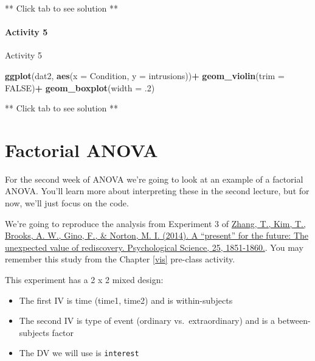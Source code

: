 \documentclass[]{book}
\newenvironment{Shaded}{\begin{snugshade}}{\end{snugshade}}
\newcommand{\DataTypeTok}[1]{\textcolor[rgb]{0.13,0.29,0.53}{#1}}
\newcommand{\FloatTok}[1]{\textcolor[rgb]{0.00,0.00,0.81}{#1}}
\newcommand{\KeywordTok}[1]{\textcolor[rgb]{0.13,0.29,0.53}{\textbf{#1}}}
\newcommand{\NormalTok}[1]{#1}
\newcommand{\OperatorTok}[1]{\textcolor[rgb]{0.81,0.36,0.00}{\textbf{#1}}}
\newcommand{\OtherTok}[1]{\textcolor[rgb]{0.56,0.35,0.01}{#1}}
\newcommand{\StringTok}[1]{\textcolor[rgb]{0.31,0.60,0.02}{#1}}
\providecommand{\tightlist}{%
  \setlength{\itemsep}{0pt}\setlength{\parskip}{0pt}}
\begin{document}
** Click tab to see solution **

\hypertarget{activity-5-4}{%
\subsubsection{Activity 5}\label{activity-5-4}}

Activity 5

\begin{Shaded}
\begin{Highlighting}[]
\KeywordTok{ggplot}\NormalTok{(dat2, }\KeywordTok{aes}\NormalTok{(}\DataTypeTok{x =}\NormalTok{ Condition, }\DataTypeTok{y =}\NormalTok{ intrusions))}\OperatorTok{+}
\StringTok{  }\KeywordTok{geom_violin}\NormalTok{(}\DataTypeTok{trim =} \OtherTok{FALSE}\NormalTok{)}\OperatorTok{+}
\StringTok{  }\KeywordTok{geom_boxplot}\NormalTok{(}\DataTypeTok{width =} \FloatTok{.2}\NormalTok{)}
\end{Highlighting}
\end{Shaded}

** Click tab to see solution **

\hypertarget{factorial-anova}{%
\chapter{Factorial ANOVA}\label{factorial-anova}}

For the second week of ANOVA we're going to look at an example of a factorial ANOVA. You'll learn more about interpreting these in the second lecture, but for now, we'll just focus on the code.

We're going to reproduce the analysis from Experiment 3 of \href{https://journals.sagepub.com/doi/abs/10.1177/0956797614542274}{Zhang, T., Kim, T., Brooks, A. W., Gino, F., \& Norton, M. I. (2014). A ``present'' for the future: The unexpected value of rediscovery. Psychological Science, 25, 1851-1860.}. You may remember this study from the Chapter \ref{vis} pre-class activity.

This experiment has a 2 x 2 mixed design:

\begin{itemize}
\tightlist
\item
  The first IV is time (time1, time2) and is within-subjects
\item
  The second IV is type of event (ordinary vs.~extraordinary) and is a between-subjects factor
\item
  The DV we will use is \texttt{interest}
\end{itemize}
\end{document}

